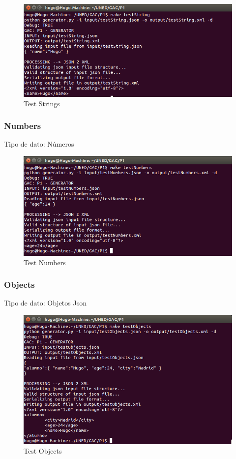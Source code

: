 \documentclass[a4paper,11pt]{book}
\begin{document}
\begin{figure}[H]  
\centering 
\includegraphics[scale=0.35]{imagenes/testString.png}
\caption{ Test Strings  }  
\end{figure} 

\subsubsection{Numbers}
Tipo de dato: Números

\begin{figure}[H]  
\centering 
\includegraphics[scale=0.35]{imagenes/testNumbers.png}
\caption{ Test Numbers  }  
\end{figure} 

\subsubsection{Objects}
Tipo de dato: Objetos Json

\begin{figure}[H]  
\centering 
\includegraphics[scale=0.35]{imagenes/testObjects.png}
\caption{ Test Objects  }  
\end{figure} 
\end{document}
